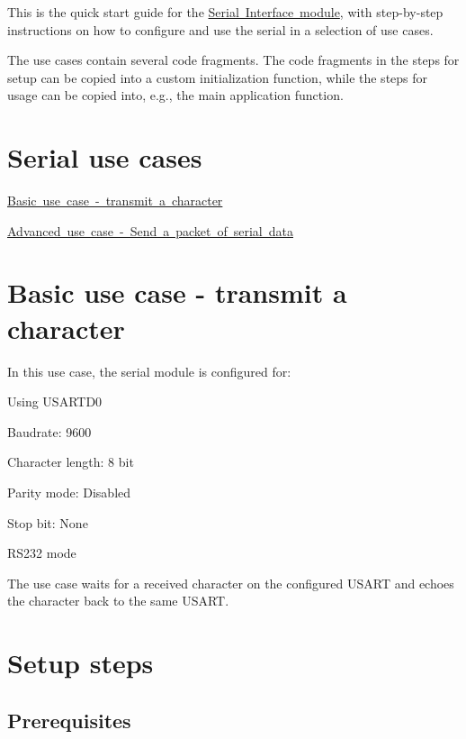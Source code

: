 This is the quick start guide for the \mbox{\hyperlink{group__serial__group}{Serial Interface module}}, with step-\/by-\/step instructions on how to configure and use the serial in a selection of use cases.

The use cases contain several code fragments. The code fragments in the steps for setup can be copied into a custom initialization function, while the steps for usage can be copied into, e.\+g., the main application function.\hypertarget{serial_quickstart_serial_use_cases}{}\section{Serial use cases}\label{serial_quickstart_serial_use_cases}

\begin{DoxyItemize}
\item \mbox{\hyperlink{serial_quickstart_serial_basic_use_case}{Basic use case -\/ transmit a character}}
\item \mbox{\hyperlink{serial_use_case_1}{Advanced use case -\/ Send a packet of serial data}}
\end{DoxyItemize}\hypertarget{serial_quickstart_serial_basic_use_case}{}\section{Basic use case -\/ transmit a character}\label{serial_quickstart_serial_basic_use_case}
In this use case, the serial module is configured for\+:
\begin{DoxyItemize}
\item Using U\+S\+A\+R\+T\+D0
\item Baudrate\+: 9600
\item Character length\+: 8 bit
\item Parity mode\+: Disabled
\item Stop bit\+: None
\item R\+S232 mode
\end{DoxyItemize}

The use case waits for a received character on the configured U\+S\+A\+RT and echoes the character back to the same U\+S\+A\+RT.\hypertarget{serial_quickstart_serial_basic_use_case_setup}{}\section{Setup steps}\label{serial_quickstart_serial_basic_use_case_setup}
\hypertarget{serial_quickstart_serial_basic_use_case_setup_prereq}{}\subsection{Prerequisites}\label{serial_quickstart_serial_basic_use_case_setup_prereq}

